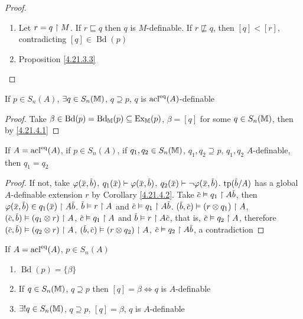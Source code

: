 \documentclass[11pt]{article}
\DeclareMathOperator{\Ex}{Ex}
\DeclareMathOperator{\Bd}{Bd}
\begin{document}
\begin{proof}
\begin{enumerate}
\item Let \(r=q\upharpoonright M\). If \(r\sqsubseteq q\) then \(q\) is \(M\)-definable. If \(r\not\sqsubseteq q\),
then \([q]<[r]\), contradicting \([q]\in\Bd(p)\)
\item Proposition \ref{4.21.3.3}
\end{enumerate}
\end{proof}

\begin{corollary}[]
\label{4.21.4.2}
If \(p\in S_n(A)\), \(\exists q\in S_n(\mathbb{M})\), \(q\supseteq p\), \(q\) is \(\operatorname{acl}^{\operatorname{eq}}(A)\)-definable
\end{corollary}

\begin{proof}
Take \(\beta\in\Bd(p)=\Bd_{\M}(p)\subseteq\Ex_{\M}(p)\), \(\beta=[q]\) for some \(q\in S_n(\mathbb{M})\), then by \ref{4.21.4.1}
\end{proof}

\begin{proposition}[]
\label{4.21.4.3}
If \(A=\operatorname{acl}^{\operatorname{eq}}(A)\), if \(p\in S_n(A)\),
if \(q_1,q_2\in S_n(\mathbb{M})\), \(q_1,q_2\supseteq p\), \(q_1,q_2\) \(A\)-definable, then \(q_1=q_2\)
\end{proposition}

\begin{proof}
If not,
take
\(\varphi(\barx,\barb)\),
\(q_1(\barx)\vdash\varphi(\barx,\barb)\), \(q_2(\barx)\vdash\neg\varphi(\barx,\barb)\). \(\tp(\barb/A)\) has a
global \(A\)-definable extension \(r\) by Corollary \ref{4.21.4.2}. Take \(\barc\vDash q_1\uhr A\barb\),
then \(\varphi(\barx,\barb)\in q_1(\barx)\uhr A\barb\). \(\barb\vDash r\uhr A\)
and
\(\barc\vDash q_1\uhr A\barb\).
\((\barb,\barc)\vDash(r\otimes q_1)\uhr A\), \((\barc,\barb)\vDash(q_1\otimes r)\uhr A\), \(\barc\vDash q_1\uhr A\)
and \(\barb\vDash r\uhr A\barc\), that is, \(\barc\vDash q_2\uhr A\),
therefore
\((\barc,\barb)\vDash(q_2\otimes r)\uhr A\), \((\barb,\barc)\vDash(r\otimes q_2)\uhr A\), \(\barc\vDash q_2\uhr A\barb\), a contradiction
\end{proof}

\begin{proposition}[]
\label{4.21.4.4}
If \(A=\operatorname{acl}^{\operatorname{eq}}(A)\), \(p\in S_n(A)\)
\begin{enumerate}
\item \(\Bd(p)=\{\beta\}\)
\item If \(q\in S_n(\mathbb{M})\), \(q\supseteq p\) then \([q]=\beta\Leftrightarrow q\) is \(A\)-definable
\item \(\exists!q\in S_n(\mathbb{M})\), \(q\supseteq p\), \([q]=\beta\), \(q\) is \(A\)-definable
\end{enumerate}
\end{proposition}
\end{document}

